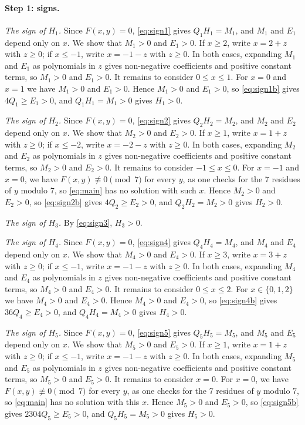 \documentclass[11pt]{article}
\begin{document}
\paragraph{Step 1: signs.} \emph{The sign of $H_{1}$.} Since $F(x,y)=0$, \eqref{eq:sign1} gives $Q_{1}H_{1}=M_{1}$, and $M_{1}$ and $E_{1}$ depend only on $x$. We show that $M_{1}>0$ and $E_{1}>0$. If $x\geq2$, write $x=2+z$ with $z\geq0$; if $x\leq-1$, write $x=-1-z$ with $z\geq0$. In both cases, expanding $M_{1}$ and $E_{1}$ as polynomials in $z$ gives non-negative coefficients and positive constant terms, so $M_{1}>0$ and $E_{1}>0$. It remains to consider $0\leq x\leq1$. For $x=0$ and $x=1$ we have $M_{1}>0$ and $E_{1}>0$. Hence $M_{1}>0$ and $E_{1}>0$, so \eqref{eq:sign1b} gives $4Q_{1}\geq E_{1}>0$, and $Q_{1}H_{1}=M_{1}>0$ gives $H_{1}>0$.

\emph{The sign of $H_{2}$.} Since $F(x,y)=0$, \eqref{eq:sign2} gives $Q_{2}H_{2}=M_{2}$, and $M_{2}$ and $E_{2}$ depend only on $x$. We show that $M_{2}>0$ and $E_{2}>0$. If $x\geq1$, write $x=1+z$ with $z\geq0$; if $x\leq-2$, write $x=-2-z$ with $z\geq0$. In both cases, expanding $M_{2}$ and $E_{2}$ as polynomials in $z$ gives non-negative coefficients and positive constant terms, so $M_{2}>0$ and $E_{2}>0$. It remains to consider $-1\leq x\leq0$. For $x=-1$ and $x=0$, we have $F(x,y)\not\equiv0\pmod{7}$ for every $y$, as one checks for the 7 residues of $y$ modulo $7$, so \eqref{eq:main} has no solution with such $x$. Hence $M_{2}>0$ and $E_{2}>0$, so \eqref{eq:sign2b} gives $4Q_{2}\geq E_{2}>0$, and $Q_{2}H_{2}=M_{2}>0$ gives $H_{2}>0$.

\emph{The sign of $H_{3}$.} By \eqref{eq:sign3}, $H_{3}>0$.

\emph{The sign of $H_{4}$.} Since $F(x,y)=0$, \eqref{eq:sign4} gives $Q_{4}H_{4}=M_{4}$, and $M_{4}$ and $E_{4}$ depend only on $x$. We show that $M_{4}>0$ and $E_{4}>0$. If $x\geq3$, write $x=3+z$ with $z\geq0$; if $x\leq-1$, write $x=-1-z$ with $z\geq0$. In both cases, expanding $M_{4}$ and $E_{4}$ as polynomials in $z$ gives non-negative coefficients and positive constant terms, so $M_{4}>0$ and $E_{4}>0$. It remains to consider $0\leq x\leq2$. For $x\in\{0,\allowbreak 1,\allowbreak 2\}$ we have $M_{4}>0$ and $E_{4}>0$. Hence $M_{4}>0$ and $E_{4}>0$, so \eqref{eq:sign4b} gives $36Q_{4}\geq E_{4}>0$, and $Q_{4}H_{4}=M_{4}>0$ gives $H_{4}>0$.

\emph{The sign of $H_{5}$.} Since $F(x,y)=0$, \eqref{eq:sign5} gives $Q_{5}H_{5}=M_{5}$, and $M_{5}$ and $E_{5}$ depend only on $x$. We show that $M_{5}>0$ and $E_{5}>0$. If $x\geq1$, write $x=1+z$ with $z\geq0$; if $x\leq-1$, write $x=-1-z$ with $z\geq0$. In both cases, expanding $M_{5}$ and $E_{5}$ as polynomials in $z$ gives non-negative coefficients and positive constant terms, so $M_{5}>0$ and $E_{5}>0$. It remains to consider $x=0$. For $x=0$, we have $F(x,y)\not\equiv0\pmod{7}$ for every $y$, as one checks for the 7 residues of $y$ modulo $7$, so \eqref{eq:main} has no solution with this $x$. Hence $M_{5}>0$ and $E_{5}>0$, so \eqref{eq:sign5b} gives $2304Q_{5}\geq E_{5}>0$, and $Q_{5}H_{5}=M_{5}>0$ gives $H_{5}>0$.
\end{document}
